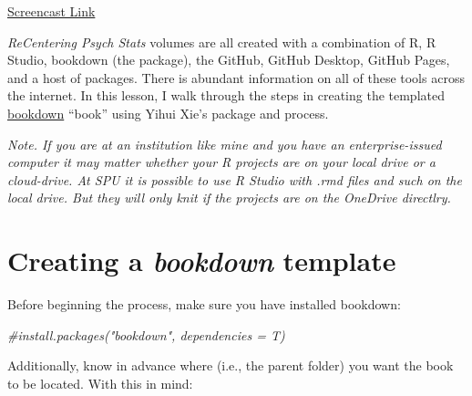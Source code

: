 \documentclass[
]{book}
\newenvironment{Shaded}{\begin{snugshade}}{\end{snugshade}}
\newcommand{\CommentTok}[1]{\textcolor[rgb]{0.56,0.35,0.01}{\textit{#1}}}
\begin{document}
\href{https://spu.hosted.panopto.com/Panopto/Pages/Viewer.aspx?pid=7c20cc56-069a-40e2-abc7-adf3017f8c47}{Screencast Link}

\emph{ReCentering Psych Stats} volumes are all created with a combination of R, R Studio, bookdown (the package), the GitHub, GitHub Desktop, GitHub Pages, and a host of packages. There is abundant information on all of these tools across the internet. In this lesson, I walk through the steps in creating the templated \href{https://bookdown.org/}{bookdown} ``book'' using Yihui Xie's package and process.

\emph{Note. If you are at an institution like mine and you have an enterprise-issued computer it may matter whether your R projects are on your local drive or a cloud-drive. At SPU it is possible to use R Studio with .rmd files and such on the local drive. But they will only knit if the projects are on the OneDrive directlry.}

\hypertarget{creating-a-bookdown-template}{%
\section{\texorpdfstring{Creating a \emph{bookdown} template}{Creating a bookdown template}}\label{creating-a-bookdown-template}}

Before beginning the process, make sure you have installed bookdown:

\begin{Shaded}
\begin{Highlighting}[]
\CommentTok{\#install.packages("bookdown", dependencies = T)}
\end{Highlighting}
\end{Shaded}

Additionally, know in advance where (i.e., the parent folder) you want the book to be located. With this in mind:
\end{document}

